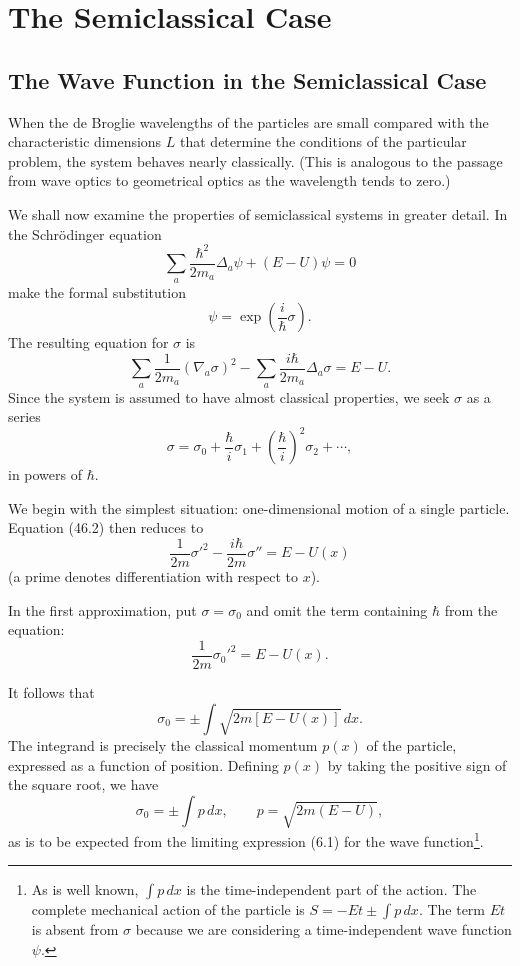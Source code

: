 \chapter{The Semiclassical Case}
\section{The Wave Function in the Semiclassical Case}

When the de Broglie wavelengths of the particles are small compared with the
characteristic dimensions $L$ that determine the conditions of the particular
problem, the system behaves nearly classically. (This is analogous to the
passage from wave optics to geometrical optics as the wavelength tends to
zero.)

We shall now examine the properties of semiclassical systems in greater
detail. In the Schr\"odinger equation
\[
  \sum_a\frac{\hbar^2}{2m_a}\Delta_a\psi+(E-U)\psi=0
\]
make the formal substitution
\begin{equation}
  \psi=\exp\left(\frac i\hbar\sigma\right).
  \tag{46.1}
\end{equation}
The resulting equation for $\sigma$ is
\begin{equation}
  \sum_a\frac1{2m_a}(\nabla_a\sigma)^2
  -\sum_a\frac{i\hbar}{2m_a}\Delta_a\sigma=E-U.
  \tag{46.2}
\end{equation}
Since the system is assumed to have almost classical properties, we seek
$\sigma$ as a series
\begin{equation}
  \sigma=\sigma_0+\frac\hbar i\sigma_1+
  \left(\frac\hbar i\right)^2\sigma_2+\cdots,
  \tag{46.3}
\end{equation}
in powers of $\hbar$.

We begin with the simplest situation: one-dimensional motion of a single
particle. Equation (46.2) then reduces to
\begin{equation}
  \frac1{2m}\sigma'^2-\frac{i\hbar}{2m}\sigma''=E-U(x)
  \tag{46.4}
\end{equation}
(a prime denotes differentiation with respect to $x$).

In the first approximation, put $\sigma=\sigma_0$ and omit the term containing
$\hbar$ from the equation:
\[
  \frac1{2m}\sigma_0'^2=E-U(x).
\]

It follows that
\[
  \sigma_0=\pm\int\sqrt{2m[E-U(x)]}\,dx.
\]
The integrand is precisely the classical momentum $p(x)$ of the particle,
expressed as a function of position. Defining $p(x)$ by taking the positive
sign of the square root, we have
\begin{equation}
  \sigma_0=\pm\int p\,dx,
  \qquad p=\sqrt{2m(E-U)},
  \tag{46.5}
\end{equation}
as is to be expected from the limiting expression (6.1) for the wave
function\footnote{As is well known, $\int p\,dx$ is the time-independent part
of the action. The complete mechanical action of the particle is
$S=-Et\pm\int p\,dx$. The term $Et$ is absent from $\sigma$ because we are
considering a time-independent wave function $\psi$.}.

